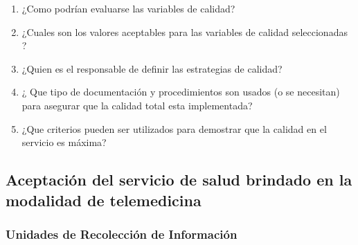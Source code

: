\begin{enumerate}
\item ¿Como podrían evaluarse las variables de calidad?
\item ¿Cuales son los valores aceptables para las variables de calidad seleccionadas ?
\item ¿Quien es el responsable de definir las estrategias de calidad?
\item ¿ Que tipo de documentación y procedimientos son usados (o se necesitan) para asegurar que la calidad total esta implementada?
\item ¿Que criterios pueden ser utilizados para demostrar que la calidad en el servicio es máxima? 
\end{enumerate}


\subsection{Aceptación del servicio de salud brindado en la modalidad de telemedicina}

\subsubsection{Unidades de Recolección de Información}

